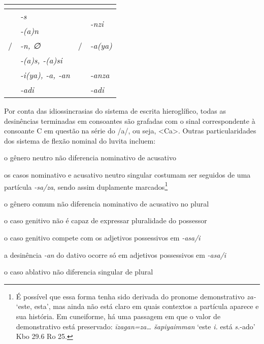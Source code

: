 \begin{center}
	\begin{tabular}[c]{llll}
		\toprule
		                      & \Sg{}\emph{}             &                       & \Pl{}\emph{}                   \\
		\midrule
		\Nom{} \Com{}         & \emph{-s}                & \Nom{} \Com{}         & \multirow{2}{4em}{\emph{-nzi}} \\
		\Acu{} \Com{}         & \emph{-{(a)}n}           & \Acu{} \Com{}         &                                \\
		\Nom{}/\Acu{} \Neut{} & \emph{-n, ∅}             & \Nom{}/\Acu{} \Neut{} & \emph{-a{(ya)}}                \\
		\Gen{}                & \emph{-{(a)}s, -{(a)}si} &                       &                                \\
		\Dat{}                & \emph{-i{(ya)}, -a, -an} & \Dat{}                & \emph{-anza}                   \\
		\Abl{}                & \emph{-adi}              & \Abl{}                & \emph{-adi}                    \\
		\bottomrule
	\end{tabular}
\end{center}

Por conta das idiossincrasias do sistema de escrita hieroglífico, todas as
desinências terminadas em consoantes são grafadas com o sinal correspondente à
consoante C em questão na série do /a/, ou seja, <Ca>.
Outras particularidades dos sistema de flexão nominal do luvita incluem:
\begin{compactitem}
	\item o gênero neutro não diferencia nominativo de acusativo
	\item os casos nominativo e acusativo neutro singular costumam ser seguidos de
	uma partícula \emph{-sa\slash{}za}, sendo assim duplamente
	marcados\footnote{É possível que essa forma tenha sido derivada do pronome
		demonstrativo \emph{za-} `este, esta', mas ainda não está claro em quais
		contextos a partícula aparece e sua história. Em cuneiforme, há uma passagem
		em que o valor de demonstrativo está preservado: \emph{īzagan=za\ldots{}
			šapiyaimman} `este \emph{i.} está \emph{s.}-ado' Kbo 29.6 Ro 25.}
	\item o gênero comum não diferencia nominativo de acusativo no plural
	\item o caso genitivo não é capaz de expressar pluralidade do possessor
	\item o caso genitivo compete com os adjetivos possessivos em
	\emph{-asa\slash{}i}
	\item a desinência \emph{-an} do dativo ocorre só em adjetivos possessivos
	em \emph{-asa\slash{}i}
	\item o caso ablativo não diferencia singular de plural
\end{compactitem}

